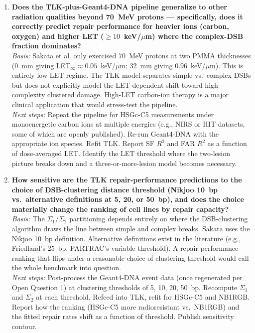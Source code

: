 \begin{enumerate}
\item \textbf{Does the TLK-plus-Geant4-DNA pipeline generalize to other radiation
qualities beyond 70~MeV protons --- specifically, does it correctly predict repair
performance for heavier ions (carbon, oxygen) and higher LET
($\geq 10$~keV/$\mu$m) where the complex-DSB fraction dominates?}\\
\textit{Basis:} Sakata et al. only exercised 70~MeV protons at two PMMA
thicknesses (0~mm giving LET$_\infty \approx 0.05$~keV/$\mu$m; 32~mm giving
$0.96$~keV/$\mu$m). This is entirely low-LET regime. The TLK model separates
simple vs.\ complex DSBs but does not explicitly model the LET-dependent shift
toward high-complexity clustered damage. High-LET carbon-ion therapy is a major
clinical application that would stress-test the pipeline.\\
\textit{Next steps:} Repeat the pipeline for HSGc-C5 measurements under
monoenergetic carbon ions at multiple energies (e.g., NIRS or HIT datasets, some
of which are openly published). Re-run Geant4-DNA with the appropriate ion
species. Refit TLK. Report SF $R^2$ and FAR $R^2$ as a function of dose-averaged
LET. Identify the LET threshold where the two-lesion picture breaks down and a
three-or-more-lesion model becomes necessary.

\item \textbf{How sensitive are the TLK repair-performance predictions to the
choice of DSB-clustering distance threshold (Nikjoo 10~bp vs.\ alternative
definitions at 5, 20, or 50~bp), and does the choice materially change the
ranking of cell lines by repair capacity?}\\
\textit{Basis:} The $\Sigma_1 / \Sigma_2$ partitioning depends entirely on where
the DSB-clustering algorithm draws the line between simple and complex breaks.
Sakata uses the Nikjoo 10~bp definition. Alternative definitions exist in the
literature (e.g., Friedland's 25~bp, PARTRAC's variable threshold). A
repair-performance ranking that flips under a reasonable choice of clustering
threshold would call the whole benchmark into question.\\
\textit{Next steps:} Post-process the Geant4-DNA event data (once regenerated
per Open Question 1) at clustering thresholds of 5, 10, 20, 50~bp. Recompute
$\Sigma_1$ and $\Sigma_2$ at each threshold. Refeed into TLK, refit for HSGc-C5
and NB1RGB. Report how the ranking (HSGc-C5 more radioresistant vs.\ NB1RGB) and
the fitted repair rates shift as a function of threshold. Publish sensitivity
contour.


\end{enumerate}
